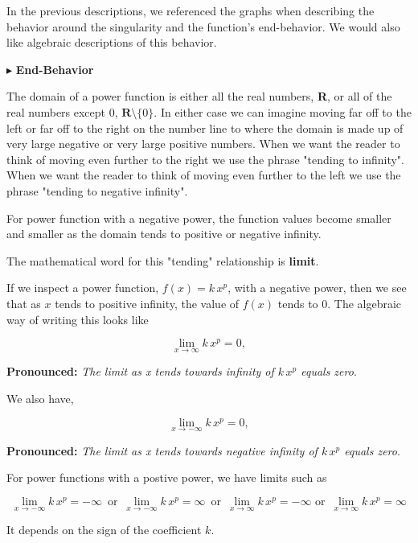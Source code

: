 \documentclass{ximera}
\begin{document}
In the previous descriptions, we referenced the graphs when describing the behavior around the singularity and the function's end-behavior.  We would also like algebraic descriptions of this behavior.


$\blacktriangleright$  \textbf{End-Behavior}

The domain of a power function is either all the real numbers, \textbf{R}, or all of the real numbers except $0$, $\textbf{R} \setminus \{ 0 \}$.  In either case we can imagine moving far off to the left or far off to the right on the number line to where the domain is made up of very large negative or very large positive numbers.  When we want the reader to think of moving even further to the right we use the phrase "tending to infinity". When we want the reader to think of moving even further to the left we use the phrase "tending to negative infinity".

For power function with a negative power, the function values become smaller and smaller as the domain tends to positive or negative infinity.

The mathematical word for this "tending" relationship is \textbf{limit}.

If we inspect a power function, $f(x) = k \, x^p$, with a negative power, then we see that as $x$ tends to positive infinity, the value of $f(x)$ tends to $0$.  The algebraic way of writing this looks like


\[    \lim_{x \to \infty} k \, x^p = 0,        \]


\textbf{Pronounced:} \textit{The limit as x tends towards infinity of $k \, x^p$ equals zero}.


We also have,

\[    \lim_{x \to -\infty} k \, x^p = 0,        \]


\textbf{Pronounced:} \textit{The limit as x tends towards negative infinity of $k \, x^p$ equals zero}.


For power functions with a postive power, we have limits such as 



\[    \lim_{x \to -\infty} k \, x^p =  -\infty  \,   \text{ or }  \,  \lim_{x \to -\infty} k \, x^p =  \infty  \,   \text{ or }  \,     \lim_{x \to \infty} k \, x^p = -\infty    \text{ or }  \,     \lim_{x \to \infty} k \, x^p = \infty  \]




It depends on the sign of the coefficient $k$.
\end{document}
